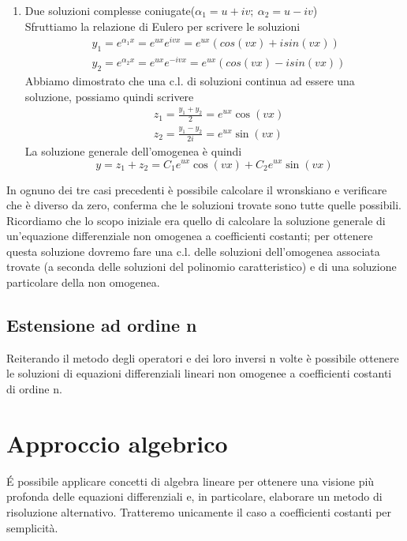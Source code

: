 \documentclass[10pt,a4paper]{article}
\begin{document}
\begin{enumerate}
	\item Due soluzioni complesse coniugate(\(\alpha_1 = u + iv;\ \alpha_2 = u-iv\))\\
	Sfruttiamo la relazione di Eulero per scrivere le soluzioni
	\begin{align*}
		&y_1 = e^{\alpha_1 x}=e^{ux}e^{ivx}=e^{ux}\left(cos(vx)+isin(vx)\right)\\
		&y_2 = e^{\alpha_2 x}=e^{ux}e^{-ivx}=e^{ux}\left(cos(vx)-isin(vx)\right)
	\end{align*}
	Abbiamo dimostrato che una c.l. di soluzioni continua ad essere una soluzione, possiamo quindi scrivere
	\begin{align*}
		&z_1 = \frac{y_1+y_2}{2}=e^{ux}\cos(vx)\\
		&z_2 = \frac{y_1-y_2}{2i}=e^{ux}\sin(vx)
	\end{align*}
	La soluzione generale dell'omogenea è quindi
	\[y=z_1+z_2= C_1 e^{ux}\cos(vx)+ C_2 e^{ux}\sin(vx)\]
\end{enumerate}
In ognuno dei tre casi precedenti è possibile calcolare il wronskiano e verificare che è diverso da zero, conferma che le soluzioni trovate sono tutte quelle possibili.\\
Ricordiamo che lo scopo iniziale era quello di calcolare la soluzione generale di un'equazione differenziale non omogenea a coefficienti costanti; per ottenere questa soluzione dovremo fare una c.l. delle soluzioni dell'omogenea associata trovate (a seconda delle soluzioni del polinomio caratteristico) e di una soluzione particolare della non omogenea.  
\subsection{Estensione ad ordine n}
Reiterando il metodo degli operatori e dei loro inversi n volte è possibile ottenere le soluzioni di equazioni differenziali lineari non omogenee a coefficienti costanti di ordine n. 


\section{Approccio algebrico}
\'{E} possibile applicare concetti di algebra lineare per ottenere una visione più profonda delle equazioni differenziali e, in particolare, elaborare un metodo di risoluzione alternativo. Tratteremo unicamente il caso a coefficienti costanti per semplicità. 
\end{document}
